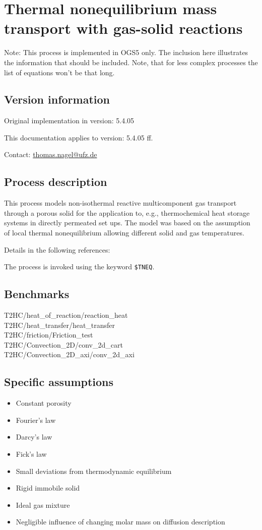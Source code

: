 \section{Thermal nonequilibrium mass transport with gas-solid reactions}
Note: This process is implemented in OGS5 only. The inclusion here illustrates the information that should be included. Note, that for less complex processes the list of equations won't be that long.

\subsection{Version information}
Original implementation in version: 5.4.05

This documentation applies to version: 5.4.05 ff.

Contact: \url{thomas.nagel@ufz.de}

\subsection{Process description}
This process models non-isothermal reactive multicomponent gas transport through a porous solid for the application to, e.g., thermochemical heat storage systems in directly permeated set ups. The model was based on the assumption of local thermal nonequilibrium allowing different solid and gas temperatures.

Details in the following references: \cite{Nagel2013,Shao2013}

The process is invoked using the keyword \texttt{\$TNEQ}.

\subsection{Benchmarks}
T2HC/heat\_of\_reaction/reaction\_heat\\
T2HC/heat\_transfer/heat\_transfer\\
T2HC/friction/Friction\_test\\
T2HC/Convection\_2D/conv\_2d\_cart\\
T2HC/Convection\_2D\_axi/conv\_2d\_axi

\subsection{Specific assumptions}
\begin{itemize}
	\item Constant porosity
	\item Fourier's law
	\item Darcy's law
	\item Fick's law
	\item Small deviations from thermodynamic equilibrium
	\item Rigid immobile solid
	\item Ideal gas mixture
	\item Negligible influence of changing molar mass on diffusion description
\end{itemize}

